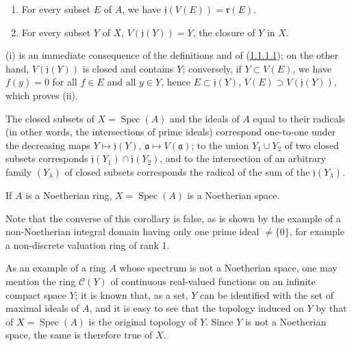 \begin{proposition}[1.1.4]
\label{I.1.1.4}
\begin{enumerate}
  \item[\rm(i)] For every subset $E$ of $A$, we have
  $\mathfrak{j}(V(E))=\mathfrak{r}(E)$.
  \item[\rm(ii)] For every subset $Y$ of $X$,
  $V(\mathfrak{j}(Y))=\overline{Y}$, the closure of $Y$ in $X$.
\end{enumerate}
\end{proposition}

(i) is an immediate consequence of the definitions and of
(\hyperref[I.1.1.1.1]{1.1.1.1}); on the other hand,
$V(\mathfrak{j}(Y))$ is closed and contains $Y$; conversely, if
$Y\subset V(E)$, we have $f(y)=0$ for all $f\in E$ and all $y\in Y$, hence
$E\subset\mathfrak{j}(Y)$, $V(E)\supset V(\mathfrak{j}(Y))$, which proves
(ii).

\begin{corollary}[1.1.5]
\label{I.1.1.5}
The closed subsets of $X=\operatorname{Spec}(A)$ and the ideals of $A$ equal
to their radicals (in other words, the intersections of prime ideals)
correspond one-to-one under the decreasing maps
$Y\mapsto\mathfrak{j}(Y)$, $\mathfrak{a}\mapsto V(\mathfrak{a})$; to the
union $Y_1\cup Y_2$ of two closed subsets corresponds
$\mathfrak{j}(Y_1)\cap\mathfrak{j}(Y_2)$, and to the intersection of an
arbitrary family $(Y_\lambda)$ of closed subsets corresponds the radical of
the sum of the $\mathfrak{j}(Y_\lambda)$.
\end{corollary}

\begin{corollary}[1.1.6]
\label{I.1.1.6}
If $A$ is a Noetherian ring, $X=\operatorname{Spec}(A)$ is a Noetherian
space.
\end{corollary}

Note that the converse of this corollary is false, as is shown by the
example of a non-Noetherian integral domain having only one prime ideal
$\neq\{0\}$, for example a non-discrete valuation ring of rank 1.

As an example of a ring $A$ whose spectrum is not a Noetherian space, one
may mention the ring $\mathcal{C}(Y)$ of continuous real-valued functions on
an infinite compact space $Y$; it is known that, as a set, $Y$ can be
identified with the set of maximal ideals of $A$, and it is easy to see that
the topology induced on $Y$ by that of $X=\operatorname{Spec}(A)$ is the
original topology of $Y$. Since $Y$ is not a Noetherian space, the same is
therefore true of $X$.

